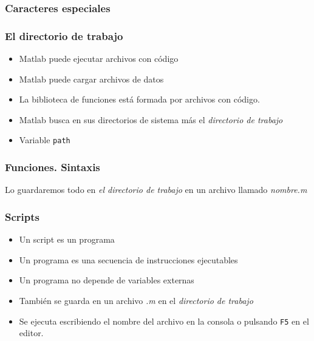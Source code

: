 \documentclass[12pt]{beamer}
\begin{document}
\begin{large}

\begin{frame}
\frametitle{Caracteres especiales}
\testcode
\end{frame}

\begin{frame}
\frametitle{El directorio de trabajo}
\begin{itemize}
\item Matlab puede ejecutar archivos con código
\item Matlab puede cargar archivos de datos
\item La biblioteca de funciones está formada por archivos con código.
\item Matlab busca en sus directorios de sistema más el \emph{directorio de
  trabajo}
\item Variable \texttt{path}
\end{itemize}
\end{frame}



\begin{frame}
\frametitle{Funciones. Sintaxis}
\testcode

Lo guardaremos todo en \emph{el directorio de trabajo} en un archivo
llamado \emph{nombre.m}
\end{frame}

\begin{frame}
\frametitle{Scripts}
\begin{itemize}
\item Un script es un programa
\item Un programa es una secuencia de instrucciones ejecutables
\item Un programa no depende de variables externas
\item También se guarda en un archivo \emph{.m} en el \emph{directorio
  de trabajo}
\item Se ejecuta escribiendo el nombre del archivo en la consola o
  pulsando \texttt{F5} en el editor.
\end{itemize}
\end{frame}


\end{large}
\end{document}
